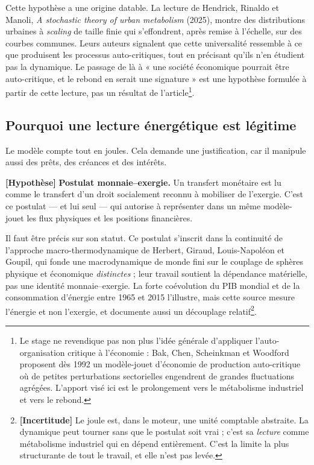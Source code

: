 \documentclass[11pt,a4paper]{article}
\newcommand{\hyp}{\textbf{[Hypothèse]}}
\newcommand{\incertitude}{\textbf{[Incertitude]}}
\begin{document}
Cette hypothèse a une origine datable. La lecture de Hendrick, Rinaldo et
Manoli, \emph{A stochastic theory of urban metabolism} (2025), montre des
distributions urbaines à \emph{scaling} de taille finie qui s'effondrent, après
remise à l'échelle, sur des courbes communes. Leurs auteurs signalent que cette
universalité ressemble à ce que produisent les processus auto-critiques, tout
en précisant qu'ils n'en étudient pas la dynamique. Le passage de là à « une
société économique pourrait être auto-critique, et le rebond en serait une
signature » est une hypothèse formulée à partir de cette lecture, pas un
résultat de l'article\footnote{Le stage ne revendique pas non plus l'idée
générale d'appliquer l'auto-organisation critique à l'économie : Bak, Chen,
Scheinkman et Woodford proposent dès 1992 un modèle-jouet d'économie de
production auto-critique où de petites perturbations sectorielles engendrent de
grandes fluctuations agrégées. L'apport visé ici est le prolongement vers le
métabolisme industriel et vers le rebond.}.

\subsection{Pourquoi une lecture énergétique est légitime}

Le modèle compte tout en joules. Cela demande une justification, car il
manipule aussi des prêts, des créances et des intérêts.

\hyp{} \textbf{Postulat monnaie--exergie.} Un transfert monétaire est lu comme
le transfert d'un droit socialement reconnu à mobiliser de l'exergie. C'est ce
postulat --- et lui seul --- qui autorise à représenter dans un même
modèle-jouet les flux physiques et les positions financières.

Il faut être précis sur son statut. Ce postulat s'inscrit dans la continuité de
l'approche macro-thermodynamique de Herbert, Giraud, Louis-Napoléon et Goupil,
qui fonde une macrodynamique de monde fini sur le couplage de sphères physique
et économique \emph{distinctes} ; leur travail soutient la dépendance
matérielle, pas une identité monnaie--exergie. La forte coévolution du PIB
mondial et de la consommation d'énergie entre 1965 et 2015 l'illustre, mais
cette source mesure l'énergie et non l'exergie, et documente aussi un
découplage relatif\footnote{\incertitude{} Le joule est, dans le moteur, une
unité comptable abstraite. La dynamique peut tourner sans que le postulat soit
vrai ; c'est sa \emph{lecture} comme métabolisme industriel qui en dépend
entièrement. C'est la limite la plus structurante de tout le travail, et elle
n'est pas levée.}.
\end{document}
